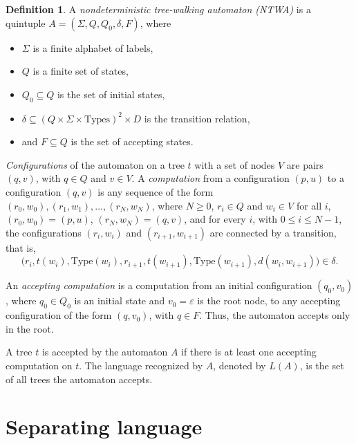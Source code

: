 \documentclass[12pt,a4paper]{article}
\theoremstyle{definition}
\newtheorem{definition}{Definition}
\renewcommand{\epsilon}{\varepsilon}
\begin{document}
\begin{definition}
A \emph{nondeterministic tree-walking automaton (NTWA)}
is a quintuple $A=(\Sigma, Q, Q_0, \delta, F)$,
where
\begin{itemize}
\item
$\Sigma$ is a finite alphabet of labels,
\item
$Q$ is a finite set of states,
\item
$Q_0 \subseteq Q$ is the set of initial states,
\item
$\delta \subseteq (Q \times \Sigma \times \mathrm{Types})^2 \times D$
is the transition relation,
\item
and $F \subseteq Q$ is the set of accepting states.
\end{itemize}

\emph{Configurations} of the automaton on a tree $t$ with a set of nodes $V$
are pairs $(q, v)$, with $q \in Q$ and $v \in V$.
A \emph{computation} from a configuration $(p, u)$ to a configuration $(q, v)$
is any sequence of the form $(r_0, w_0), (r_1, w_1), \ldots, (r_N, w_N)$,
where $N \geqslant 0$,
$r_i \in Q$ and $w_i \in V$ for all $i$,
$(r_0, w_0)=(p, u)$,
$(r_N, w_N)=(q, v)$,
and 
for every $i$, with $0 \leqslant i \leqslant N-1$,
the configurations $(r_i, w_i)$ and $(r_{i+1},w_{i+1})$ are connected by a transition,
that is,
\begin{equation*}
	\big(r_i, t(w_i), \mathrm{Type}(w_i),
	r_{i+1}, t(w_{i+1}), \mathrm{Type}(w_{i+1}),
	d(w_i, w_{i+1})\big) \in \delta.
\end{equation*}

An \emph{accepting computation} is a computation from an initial configuration $(q_0, v_0)$,
where $q_0 \in Q_0$ is an initial state and $v_0=\epsilon$ is the root node,
to any accepting configuration of the form $(q, v_0)$, with $q \in F$.
Thus, the automaton accepts only in the root.

A tree $t$ is accepted by the automaton $A$
if there is at least one accepting computation on $t$.
The language recognized by $A$, denoted by $L(A)$,
is the set of all trees the automaton accepts.
\end{definition}






\section{Separating language}\label{section_separating_language}
\end{document}
